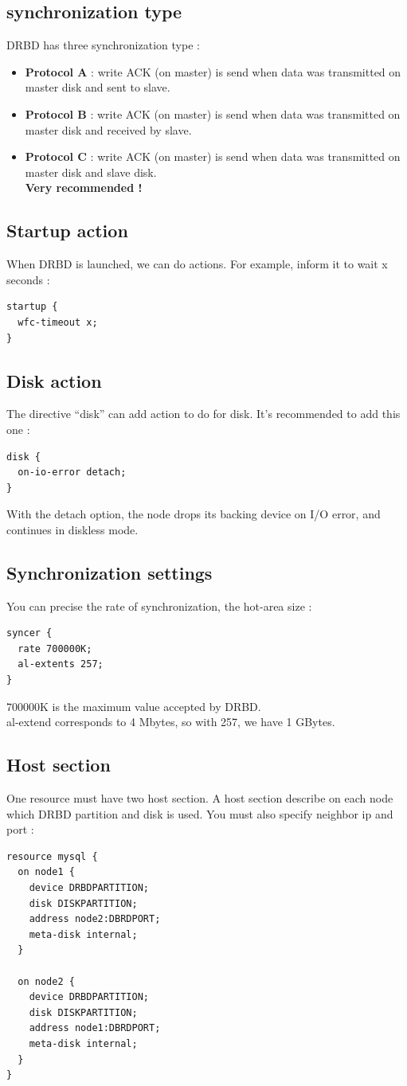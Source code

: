 \documentclass[a4paper,10pt]{report}
\begin{document}
\subsection{synchronization type}
DRBD has three synchronization type :
\begin{itemize}
\item \textbf{Protocol A} : write ACK (on master) is send when data was transmitted on master disk and sent to slave.
\item \textbf{Protocol B} : write ACK (on master) is send when data was transmitted on master disk and received by slave.
\item \textbf{Protocol C} : write ACK (on master) is send when data was transmitted on master disk and slave disk.\\
\textbf{Very recommended !}
\end{itemize}

\subsection{Startup action}
When DRBD is launched, we can do actions. For example, inform it to wait x seconds :
\begin{lstlisting}
startup {
  wfc-timeout x;
}
\end{lstlisting}

\subsection{Disk action}
The directive ``disk'' can add action to do for disk. It's recommended to add this one :
\begin{lstlisting}
disk {
  on-io-error detach;
}
\end{lstlisting}
With the detach option, the node drops its backing device on I/O error, and continues in diskless mode.

\subsection{Synchronization settings}
You can precise the rate of synchronization, the hot-area size :
\begin{lstlisting}
syncer {
  rate 700000K;
  al-extents 257;
}
\end{lstlisting}
700000K is the maximum value accepted by DRBD.\\
al-extend corresponds to 4 Mbytes, so with 257, we have 1 GBytes.

\subsection{Host section}
\label{hostsection} 
One resource must have two host section. A host section describe on each node which DRBD partition and disk is used. You must also specify neighbor ip and port :
\begin{lstlisting}
resource mysql {
  on node1 {
    device DRBDPARTITION;
    disk DISKPARTITION;
    address node2:DBRDPORT;
    meta-disk internal;
  }

  on node2 {
    device DRBDPARTITION;
    disk DISKPARTITION;
    address node1:DBRDPORT;
    meta-disk internal;
  }
}
\end{lstlisting}
\end{document}
